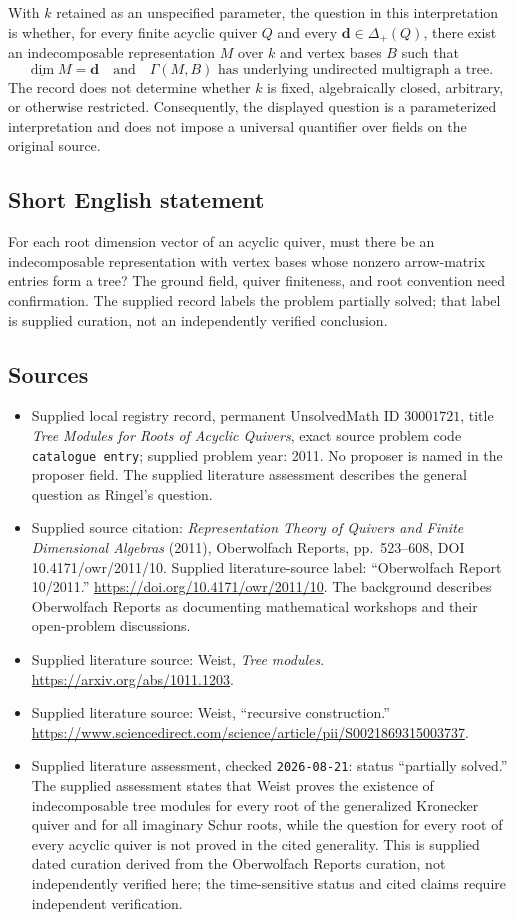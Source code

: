 \documentclass[11pt]{article}
\begin{document}
With \(k\) retained as an unspecified parameter, the question in this interpretation is whether, for every finite acyclic quiver \(Q\) and every \(\mathbf d\in\Delta_+(Q)\), there exist an indecomposable representation \(M\) over \(k\) and vertex bases \(B\) such that
\[
\underline{\dim}M=\mathbf d
\quad\text{and}\quad
\Gamma(M,B)\text{ has underlying undirected multigraph a tree}.
\]
The record does not determine whether \(k\) is fixed, algebraically closed, arbitrary, or otherwise restricted. Consequently, the displayed question is a parameterized interpretation and does not impose a universal quantifier over fields on the original source.
\subsection{Short English statement}
For each root dimension vector of an acyclic quiver, must there be an indecomposable representation with vertex bases whose nonzero arrow-matrix entries form a tree? The ground field, quiver finiteness, and root convention need confirmation. The supplied record labels the problem partially solved; that label is supplied curation, not an independently verified conclusion.
\subsection{Sources}
\begin{itemize}
\item Supplied local registry record, permanent UnsolvedMath ID \(30001721\), title \emph{Tree Modules for Roots of Acyclic Quivers}, exact source problem code \texttt{catalogue entry}; supplied problem year: 2011. No proposer is named in the proposer field. The supplied literature assessment describes the general question as Ringel's question.
\item Supplied source citation: \emph{Representation Theory of Quivers and Finite Dimensional Algebras} (2011), Oberwolfach Reports, pp.~523--608, DOI 10.4171/owr/2011/10. Supplied literature-source label: ``Oberwolfach Report 10/2011.'' \url{https://doi.org/10.4171/owr/2011/10}. The background describes Oberwolfach Reports as documenting mathematical workshops and their open-problem discussions.
\item Supplied literature source: Weist, \emph{Tree modules}. \url{https://arxiv.org/abs/1011.1203}.
\item Supplied literature source: Weist, ``recursive construction.'' \url{https://www.sciencedirect.com/science/article/pii/S0021869315003737}.
\item Supplied literature assessment, checked \texttt{2026-08-21}: status ``partially solved.'' The supplied assessment states that Weist proves the existence of indecomposable tree modules for every root of the generalized Kronecker quiver and for all imaginary Schur roots, while the question for every root of every acyclic quiver is not proved in the cited generality. This is supplied dated curation derived from the Oberwolfach Reports curation, not independently verified here; the time-sensitive status and cited claims require independent verification.
\end{itemize}
\end{document}
